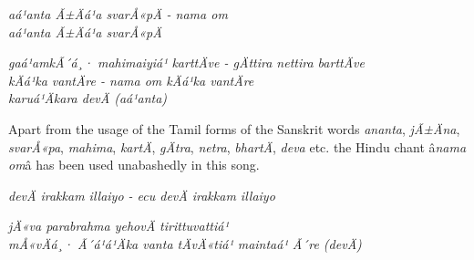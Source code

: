 \begin{myquote}
\textit{aá¹anta Ã±Äá¹a svarÅ«pÄ - nama om\\ aá¹anta Ã±Äá¹a svarÅ«pÄ}
\end{myquote}

\begin{myquote}
\textit{gaá¹amkÃ´á¸· mahimaiyiá¹ karttÄve - gÄttira nettira barttÄve \\ kÄá¹ka vantÄre - nama om kÄá¹ka vantÄre\\ karuá¹Äkara devÄ (aá¹anta) }
\end{myquote}

\begin{myquote}
\end{myquote}

\begin{myquote}
\end{myquote}

Apart from the usage of the Tamil forms of the Sanskrit words \textit{ananta}, \textit{jÃ±Äna}, \textit{svarÅ«pa}, \textit{mahima}, \textit{kartÄ}, \textit{gÄtra}, \textit{netra}, \textit{bhartÄ}, \textit{deva} etc. the Hindu chant â\textit{nama om}â has been used unabashedly in this song.

\begin{myquote}
\textit{devÄ irakkam illaiyo - ecu devÄ irakkam illaiyo}
\end{myquote}

\begin{myquote}
\textit{jÄ«va parabrahma yehovÄ tirittuvattiá¹ \\ mÅ«vÄá¸· Ã´á¹á¹Äka vanta tÄvÄ«tiá¹ maintaá¹ Ã´re (devÄ)}
\end{myquote}

\begin{myquote}
\end{myquote}

